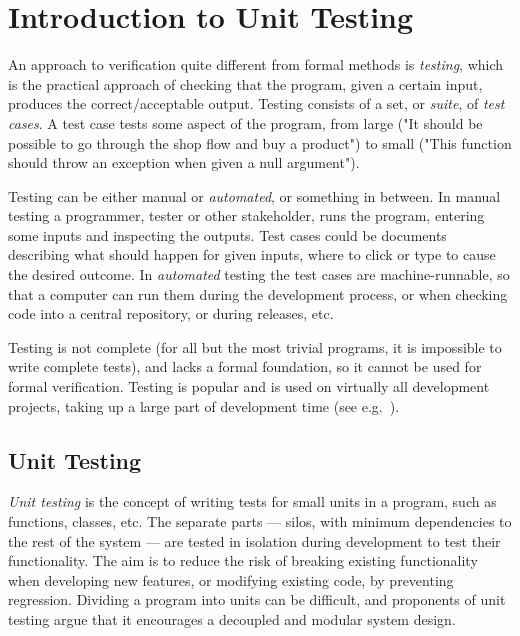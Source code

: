 \documentclass[a4paper,11pt]{kth-mag}
\theoremstyle{definition}
\begin{document}
\pagestyle{newchap}
\chapter{Introduction to Unit Testing} \label{chapter-intro-to-unit-testing}

An approach to verification quite different from formal methods is
\emph{testing}, which is the practical approach of checking that the program,
given a certain input, produces the correct/acceptable output. Testing consists
of a set, or \textit{suite}, of \textit{test cases}. A test case tests some
aspect of the program, from large ("It should be possible to go through the
shop flow and buy a product") to small ("This function should throw an
exception when given a null argument").

Testing can be either manual or \textit{automated}, or something in between. In
manual testing a programmer, tester or other stakeholder, runs the program,
entering some inputs and inspecting the outputs. Test cases could be documents
describing what should happen for given inputs, where to click or type to cause
the desired outcome. In \textit{automated} testing the test cases are
machine-runnable, so that a computer can run them during the development
process, or when checking code into a central repository, or during releases,
etc.

Testing is not complete (for all but the most trivial programs, it is
impossible to write complete tests), and lacks a formal foundation, so it
cannot be used for formal verification. Testing is popular and is used on
virtually all development projects, taking up a large part of development time
(see e.g.\ \cite{brooks75mythicalmanmonth}).


\section{Unit Testing}

\textit{Unit testing} is the concept of writing tests for small units in a
program, such as functions, classes, etc. The separate parts --- silos, with
minimum dependencies to the rest of the system --- are tested in isolation
during development to test their functionality. The aim is to reduce the risk
of breaking existing functionality when developing new features, or modifying
existing code, by preventing regression. Dividing a program into units can be
difficult, and proponents of unit testing argue that it encourages a decoupled
and modular system design.
\end{document}

